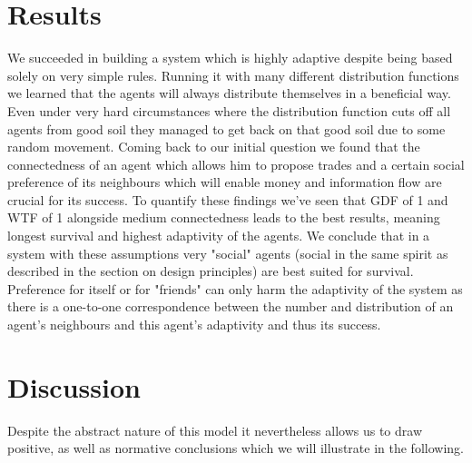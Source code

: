 \documentclass{JASSS}
\begin{document}
	
\section{Results}
We succeeded in building a system which is highly adaptive despite being based solely on very simple rules. Running it with many different distribution functions we learned that the agents will always distribute themselves in a beneficial way. Even under very hard circumstances where the distribution function cuts off all agents from good soil they managed to get back on that good soil due to some random movement. Coming back to our initial question we found that the connectedness of an agent which allows him to propose trades and a certain social preference of its neighbours which will enable money and information flow are crucial for its success. To quantify these findings we've seen that GDF of 1 and WTF of 1 alongside medium connectedness leads to the best results, meaning longest survival and highest adaptivity of the agents. We conclude that in a system with these assumptions very "social" agents (social in the same spirit as described in the section on design principles) are best suited for survival. Preference for itself or for "friends" can only harm the adaptivity of the system as there is a one-to-one correspondence between the number and distribution of an agent's neighbours and this agent's adaptivity and thus its success.  

\section{Discussion}
Despite the abstract nature of this model it nevertheless allows us to draw positive, as well as normative conclusions which we will illustrate in the following.
\end{document}
